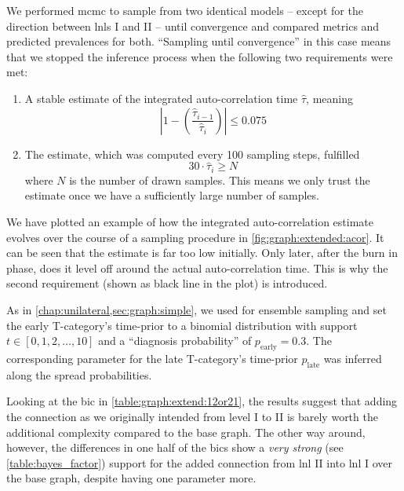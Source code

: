 \documentclass[\relativeRoot/main.tex]{subfiles}
\begin{document}
We performed \gls{mcmc} to sample from two identical models -- except for the direction between \glspl{lnl} I and II -- until convergence and compared metrics and predicted prevalences for both. ``Sampling until convergence'' in this case means that we stopped the inference process when the following two requirements were met:

\begin{enumerate}
    \item A stable estimate of the integrated auto-correlation time $\hat{\tau}$, meaning
    \begin{equation}
        \left| 1 - \left( \frac{\hat{\tau}_{i-1}}{\hat{\tau}_i} \right) \right| \leq 0.075
    \end{equation}
    \item The estimate, which was computed every 100 sampling steps, fulfilled
    \begin{equation}
        30 \cdot \hat{\tau}_i \geq N
    \end{equation}
    where $N$ is the number of drawn samples. This means we only trust the estimate once we have a sufficiently large number of samples.
\end{enumerate}

We have plotted an example of how the integrated auto-correlation estimate evolves over the course of a sampling procedure in \cref{fig:graph:extended:acor}. It can be seen that the estimate is far too low initially. Only later, after the burn in phase, does it level off around the actual auto-correlation time. This is why the second requirement (shown as black line in the plot) is introduced.

As in \cref{chap:unilateral,sec:graph:simple}, we used  for ensemble sampling and set the early T-category's time-prior to a binomial distribution with support $t \in [0, 1, 2, \ldots, 10]$ and a ``diagnosis probability'' of $p_\text{early} = 0.3$. The corresponding parameter for the late T-category's time-prior $p_\text{late}$ was inferred along the spread probabilities.

Looking at the \gls{bic} in \cref{table:graph:extend:12or21}, the results suggest that adding the connection as we originally intended from level I to II is barely worth the additional complexity compared to the base graph. The other way around, however, the differences in one half of the \glspl{bic} show a \emph{very strong} (see \cref{table:bayes_factor}) support for the added connection from \gls{lnl} II into \gls{lnl} I over the base graph, despite having one parameter more.
\end{document}
